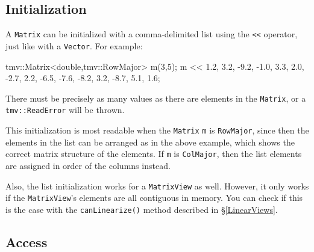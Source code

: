 \documentclass[twoside,letterpaper,11pt]{article}
\renewcommand{\tt}[1]{{\lstinline {#1}}}
\begin{document}
\subsection{Initialization}
\label{Matrix_Initialization}

A \tt{Matrix} can be initialized with a comma-delimited list using
the \tt{<<} operator, just like with a \tt{Vector}.  For example:
\begin{tmvcode}
tmv::Matrix<double,tmv::RowMajor> m(3,5);
m << 1.2,  3.2, -9.2, -1.0,  3.3, 
     2.0, -2.7,  2.2, -6.5, -7.6, 
    -8.2,  3.2, -8.7,  5.1,  1.6;
\end{tmvcode}
There must be precisely as many values as there are elements in the \tt{Matrix},
or a \tt{tmv::ReadError} will be thrown.

This initialization is most readable when the \tt{Matrix} \tt{m} is \tt{RowMajor}, since then the 
elements in the list can be arranged as in the above example, which shows the
correct matrix structure of the elements.  If \tt{m} is \tt{ColMajor}, then the
list elements are assigned in order of the columns instead.

Also, the list initialization works for a \tt{MatrixView} as well.  However, it only works
if the \tt{MatrixView}'s elements are all contiguous in memory.  You can check
if this is the case with the \tt{canLinearize()} method described in \S\ref{LinearViews}.

\subsection{Access}
\label{Matrix_Access}
\end{document}
